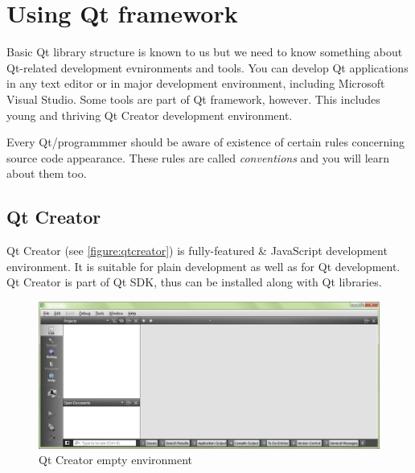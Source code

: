 \section{Using Qt framework}
Basic Qt library structure is known to us but we need to know something about Qt-related development evnironments and tools. You can develop Qt applications in any text editor or in major development environment, including Microsoft Visual Studio. Some tools are part of Qt framework, however. This includes young and thriving Qt Creator development environment.

Every Qt/\cpp programmmer should be aware of existence of certain rules concerning source code appearance. These rules are called \textit{conventions} and you will learn about them too.

\subsection{Qt Creator}
Qt Creator (see \autoref{figure:qtcreator}) is fully-featured \cpp \& JavaScript development environment. It is suitable for plain \cpp development as well as for Qt development. Qt Creator is part of Qt SDK, thus can be installed along with Qt libraries.

\begin{figure}[ht]
\centering
\includegraphics[width=14.5cm]{graphics/laboratory/03-qtcreator.png}
\caption{Qt Creator empty environment}\label{figure:qtcreator}
\end{figure}

